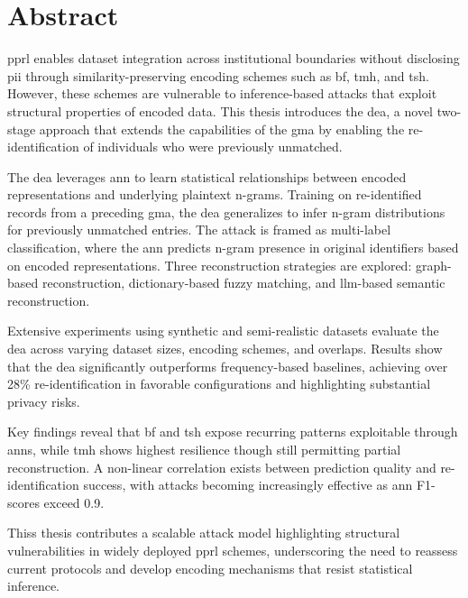 

\chapter{Abstract}

\ac{pprl} enables dataset integration across institutional boundaries without disclosing \ac{pii} through similarity-preserving encoding schemes such as \ac{bf}, \ac{tmh}, and \ac{tsh}.
However, these schemes are vulnerable to inference-based attacks that exploit structural properties of encoded data.
This thesis introduces the \ac{dea}, a novel two-stage approach that extends the capabilities of the \ac{gma} by enabling the re-identification of individuals who were previously unmatched.

The \ac{dea} leverages \ac{ann} to learn statistical relationships between encoded representations and underlying plaintext n-grams.
Training on re-identified records from a preceding \ac{gma}, the \ac{dea} generalizes to infer n-gram distributions for previously unmatched entries.
The attack is framed as multi-label classification, where the \ac{ann} predicts n-gram presence in original identifiers based on encoded representations.
Three reconstruction strategies are explored: graph-based reconstruction, dictionary-based fuzzy matching, and \ac{llm}-based semantic reconstruction.

Extensive experiments using synthetic and semi-realistic datasets evaluate the \ac{dea} across varying dataset sizes, encoding schemes, and overlaps.
Results show that the \ac{dea} significantly outperforms frequency-based baselines, achieving over 28\% re-identification in favorable configurations and highlighting substantial privacy risks.

Key findings reveal that \ac{bf} and \ac{tsh} expose recurring patterns exploitable through \ac{ann}s, while \ac{tmh} shows highest resilience though still permitting partial reconstruction.
A non-linear correlation exists between prediction quality and re-identification success, with attacks becoming increasingly effective as \ac{ann} F1-scores exceed 0.9.

Thiss thesis contributes a scalable attack model highlighting structural vulnerabilities in widely deployed \ac{pprl} schemes, underscoring the need to reassess current protocols and develop encoding mechanisms that resist statistical inference.
